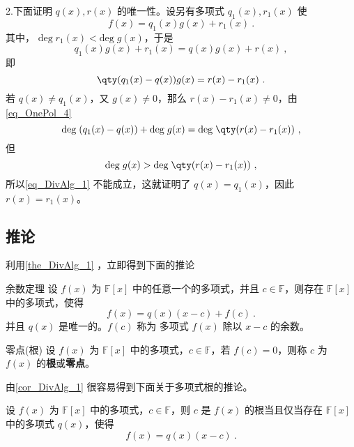 2.下面证明 $q(x),r(x)$ 的唯一性。设另有多项式 $q_1(x),r_1(x)$ 使
\begin{equation}
f(x)=q_1(x)g(x)+r_1(x)~.
\end{equation}
其中， $\mathrm{deg}\;r_1(x)<\mathrm{deg}\;g(x)$，于是
\begin{equation}
q_1(x)g(x)+r_1(x)=q(x)g(x)+r(x)~,
\end{equation}
即
\begin{equation}
\qty(q_1(x)-q(x))g(x)=r(x)-r_1(x)~.
\end{equation}
若 $q(x)\neq q_1(x)$，又 $g(x)\neq 0$，那么 $r(x)-r_1(x)\neq 0$，由\autoref{eq_OnePol_4}~
\begin{equation}\label{eq_DivAlg_1}
\mathrm{deg}\;(q_1(x)-q(x))+\mathrm{deg}\;g(x)=\mathrm{deg}\;\qty(r(x)-r_1(x))~,
\end{equation}
但
\begin{equation}
\mathrm{deg}\;g(x)>\mathrm{deg}\;\qty(r(x)-r_1(x))~,
\end{equation}
所以\autoref{eq_DivAlg_1} 不能成立，这就证明了
$q(x)=q_1(x)$，因此 $r(x)=r_1(x)$。





\begin{example}{}

\end{example}






\subsection{推论}
利用\autoref{the_DivAlg_1} ，立即得到下面的推论
\begin{corollary}{余数定理}\label{cor_DivAlg_1}
设 $f(x)$ 为 $\mathbb{F}[x]$ 中的任意一个的多项式，并且 $c\in\mathbb{F}$，则存在 $\mathbb{F}[x]$ 中的多项式，使得
\begin{equation}
f(x)=q(x)(x-c)+f(c)~.
\end{equation}
并且 $q(x)$ 是唯一的。$f(c)$ 称为 多项式 $f(x)$ 除以 $x-c$ 的余数。
\end{corollary}
\begin{definition}{零点(根)}
设 $f(x)$ 为 $\mathbb{F}[x]$ 中的多项式，$c\in\mathbb{F}$，若 $f(c)=0$，则称 $c$ 为 $f(x)$ 的\textbf{根}或\textbf{零点}。
\end{definition}
由\autoref{cor_DivAlg_1} 很容易得到下面关于多项式根的推论。
\begin{corollary}{}\label{cor_DivAlg_2}
设 $f(x)$ 为 $\mathbb{F}[x]$ 中的多项式，$c\in\mathbb{F}$，则 $c$ 是 $f(x)$ 的根当且仅当存在 $\mathbb{F}[x]$ 中的多项式 $q(x)$，使得
\begin{equation}
f(x)=q(x)(x-c)~.
\end{equation}

\end{corollary}
